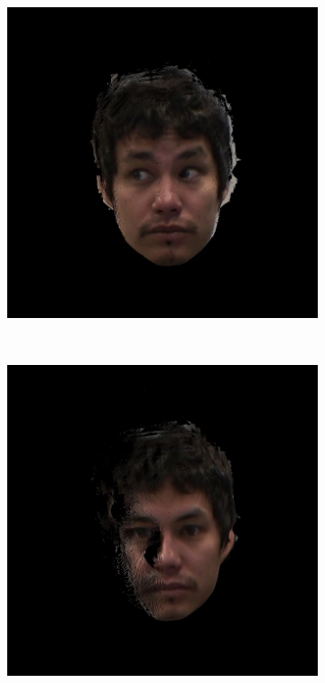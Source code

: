 \documentclass{ut-thesis}
\begin{document}
\begin{figure}[h]
\begin{subfigure}[b]{0.32\textwidth}
	\end{subfigure}
	\begin{subfigure}[b]{0.32\textwidth}
		\includegraphics[width=1.1\linewidth]{./img/eyeimages/s3.jpg}
	\end{subfigure}
	\\
	\begin{subfigure}[b]{0.24\textwidth}
		\includegraphics[width=1.1\linewidth]{./img/eyeimages/f1.jpg}

\end{subfigure}
\end{figure}
\end{document}

